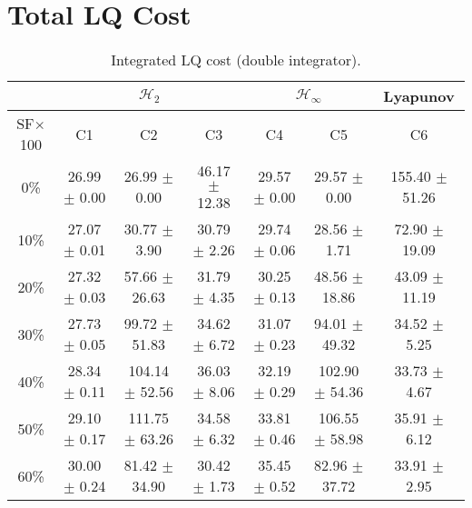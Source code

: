 \section{Total LQ Cost}
\begin{table}[H]
\centering
\scriptsize
\begin{tabular}{| c || c | c | c | c | c | c |}
	\hline
	 & \multicolumn{3}{c|}{$\mathcal{H}_{2}$} & \multicolumn{2}{c|}{$\mathcal{H}_{\infty}$} & Lyapunov\\
	\hline
	SF$\times$100 & C1& C2 & C3 & C4 & C5 & C6\\
	\hline\hline
	0\% & 26.99 $\pm$ 0.00 & 26.99 $\pm$ 0.00 & 46.17 $\pm$ 12.38 & 29.57 $\pm$ 0.00 & 29.57 $\pm$ 0.00 & 155.40 $\pm$ 51.26\\
	\hline
	10\% & 27.07 $\pm$ 0.01 & 30.77 $\pm$ 3.90 & 30.79 $\pm$ 2.26 & 29.74 $\pm$ 0.06 & 28.56 $\pm$ 1.71 & 72.90 $\pm$ 19.09\\
	\hline
	20\% & 27.32 $\pm$ 0.03 & 57.66 $\pm$ 26.63 & 31.79 $\pm$ 4.35 & 30.25 $\pm$ 0.13 & 48.56 $\pm$ 18.86 & 43.09 $\pm$ 11.19\\
	\hline
	30\% & 27.73 $\pm$ 0.05 & 99.72 $\pm$ 51.83 & 34.62 $\pm$ 6.72 & 31.07 $\pm$ 0.23 & 94.01 $\pm$ 49.32 & 34.52 $\pm$ 5.25\\
	\hline
	40\% & 28.34 $\pm$ 0.11 & 104.14 $\pm$ 52.56 & 36.03 $\pm$ 8.06 & 32.19 $\pm$ 0.29 & 102.90 $\pm$ 54.36 & 33.73 $\pm$ 4.67\\
	\hline
	50\% & 29.10 $\pm$ 0.17 & 111.75 $\pm$ 63.26 & 34.58 $\pm$ 6.32 & 33.81 $\pm$ 0.46 & 106.55 $\pm$ 58.98 & 35.91 $\pm$ 6.12\\
	\hline
	60\% & 30.00 $\pm$ 0.24 & 81.42 $\pm$ 34.90 & 30.42 $\pm$ 1.73 & 35.45 $\pm$ 0.52 & 82.96 $\pm$ 37.72 & 33.91 $\pm$ 2.95\\
	\hline
\end{tabular}
\caption{Integrated LQ cost (double integrator).}
\label{table:lq_cost_double_integrator:noise}
\end{table}

